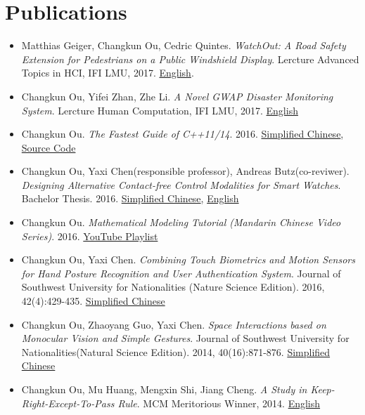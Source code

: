 \documentclass[letterpaper,11pt]{article}
\newcommand{\resumeSubHeadingListStart}{\begin{itemize}[leftmargin=*]}
\newcommand{\resumeSubHeadingListEnd}{\end{itemize}}
\begin{document}
\section{Publications}
 \resumeSubHeadingListStart
   \item{
    Matthias Geiger, Changkun Ou, Cedric Quintes.
     \emph{WatchOut: A Road Safety Extension for Pedestrians on a Public Windshield Display}.
     Lercture Advanced Topics in HCI, IFI LMU, 2017. \href{https://github.com/changkun/ath-windshild-display/blob/master/paper/ath.pdf}{English}.
   }
   \item{
     Changkun Ou, Yifei Zhan, Zhe Li.
     \emph{A Novel GWAP Disaster Monitoring System}.
     Lercture Human Computation, IFI LMU, 2017.
     \href{https://github.com/changkun/hc-ss17-disaster-monitoring/blob/master/report/hc_final_project_report_team_Hotpot.pdf}{English}
   }
   \item{
       Changkun Ou.
       \emph{The Fastest Guide of C++11/14}. 
       2016.
       \href{https://www.gitbook.com/book/changkun/cpp1x-tutorial/details}{Simplified Chinese}, 
       \href{https://github.com/changkun/cpp1x-tutorial}{Source Code}
   }
   \item{
       Changkun Ou, Yaxi Chen(responsible professor), Andreas Butz(co-reviwer).
       \emph{Designing Alternative Contact-free Control Modalities for Smart Watches}. 
       Bachelor Thesis. 2016. \href{https://changkun.us/files/cv/bachelor-thesis-cn.html}{Simplified Chinese}, 
       \href{https://changkun.us/files/cv/bachelor-thesis-en.html}{English}
   }
   \item{
       Changkun Ou.
       \emph{Mathematical Modeling Tutorial (Mandarin Chinese Video Series)}.
       2016. \href{https://www.youtube.com/watch?v=EUfXE3vP9_A&list=PLwUqqMt5en7c7iZIseCVAS5BX6RPkS-qR}{YouTube Playlist}
   }
   \item{
       Changkun Ou, Yaxi Chen. 
       \emph{Combining Touch Biometrics and Motion Sensors for Hand Posture Recognition and User Authentication System}. 
       Journal of Southwest University for Nationalities (Nature Science Edition). 
       2016, 42(4):429-435. \href{https://changkun.us/files/cv/touch.swun.html}{Simplified Chinese}
   }
   \item{
       Changkun Ou, Zhaoyang Guo, Yaxi Chen.
       \emph{Space Interactions based on Monocular Vision and Simple Gestures}. 
       Journal of Southwest University for Nationalities(Natural Science Edition). 
       2014, 40(16):871-876. \href{https://changkun.us/files/cv/vision.swun.html}{Simplified Chinese}
   }
   \item{
       Changkun Ou, Mu Huang, Mengxin Shi, Jiang Cheng. 
       \emph{A Study in Keep-Right-Except-To-Pass Rule}. 
       MCM Meritorious Winner, 2014. \href{https://changkun.us/files/cv/28922.public.html}{English}
   }
 \resumeSubHeadingListEnd
\end{document}
